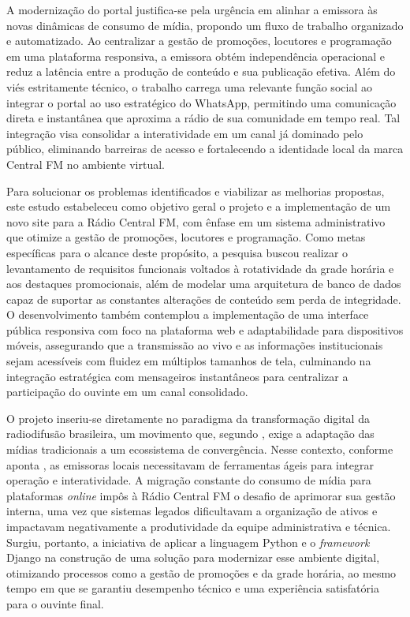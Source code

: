 \documentclass[12pt, openright, oneside, a4paper, brazil]{ads-unipac-abntex2}
\begin{document}
A modernização do portal justifica-se pela urgência em alinhar a emissora às novas dinâmicas de consumo de mídia, propondo um fluxo de trabalho organizado e automatizado. Ao centralizar a gestão de promoções, locutores e programação em uma plataforma responsiva, a emissora obtém independência operacional e reduz a latência entre a produção de conteúdo e sua publicação efetiva. Além do viés estritamente técnico, o trabalho carrega uma relevante função social ao integrar o portal ao uso estratégico do WhatsApp, permitindo uma comunicação direta e instantânea que aproxima a rádio de sua comunidade em tempo real. Tal integração visa consolidar a interatividade em um canal já dominado pelo público, eliminando barreiras de acesso e fortalecendo a identidade local da marca Central FM no ambiente virtual.

Para solucionar os problemas identificados e viabilizar as melhorias propostas, este estudo estabeleceu como objetivo geral o projeto e a implementação de um novo site para a Rádio Central FM, com ênfase em um sistema administrativo que otimize a gestão de promoções, locutores e programação. Como metas específicas para o alcance deste propósito, a pesquisa buscou realizar o levantamento de requisitos funcionais voltados à rotatividade da grade horária e aos destaques promocionais, além de modelar uma arquitetura de banco de dados capaz de suportar as constantes alterações de conteúdo sem perda de integridade. O desenvolvimento também contemplou a implementação de uma interface pública responsiva com foco na plataforma web e adaptabilidade para dispositivos móveis, assegurando que a transmissão ao vivo e as informações institucionais sejam acessíveis com fluidez em múltiplos tamanhos de tela, culminando na integração estratégica com mensageiros instantâneos para centralizar a participação do ouvinte em um canal consolidado.

O projeto inseriu-se diretamente no paradigma da transformação digital da radiodifusão brasileira, um movimento que, segundo , exige a adaptação das mídias tradicionais a um ecossistema de convergência. Nesse contexto, conforme aponta , as emissoras locais necessitavam de ferramentas ágeis para integrar operação e interatividade. A migração constante do consumo de mídia para plataformas \textit{online} impôs à Rádio Central FM o desafio de aprimorar sua gestão interna, uma vez que sistemas legados dificultavam a organização de ativos e impactavam negativamente a produtividade da equipe administrativa e técnica. Surgiu, portanto, a iniciativa de aplicar a linguagem Python e o \textit{framework} Django na construção de uma solução para modernizar esse ambiente digital, otimizando processos como a gestão de promoções e da grade horária, ao mesmo tempo em que se garantiu desempenho técnico e uma experiência satisfatória para o ouvinte final.
\end{document}

